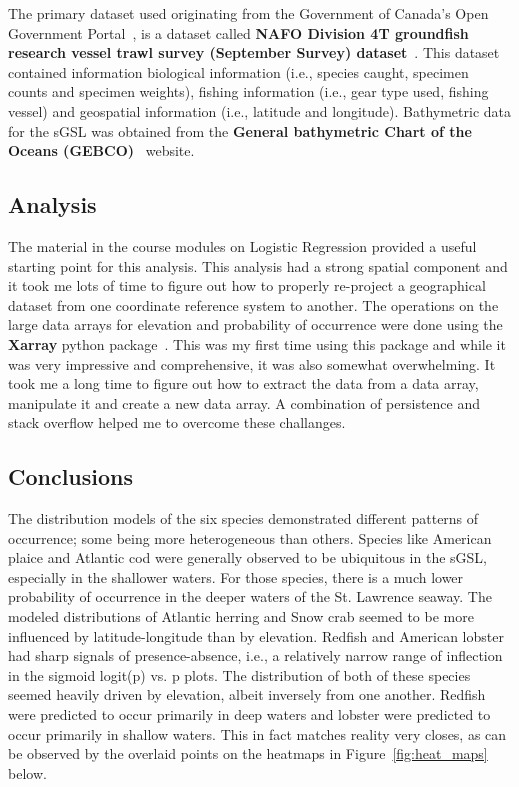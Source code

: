 The primary dataset used originating from the Government of Canada's Open Government Portal~\cite{ogp}, is a dataset called
\textbf{NAFO Division 4T groundfish research vessel trawl survey (September Survey) dataset}~\cite{groundfish}.
This dataset contained information biological information (i.e., species caught, specimen counts and specimen weights),
fishing information (i.e., gear type used, fishing vessel) and geospatial information (i.e., latitude and longitude).
Bathymetric data for the sGSL was obtained from the \textbf{General bathymetric Chart of the Oceans (GEBCO)}~\cite{gebco} website.


\subsection{Analysis}

The material in the course modules on Logistic Regression provided a useful starting point for this analysis.
This analysis had a strong spatial component and it took me lots of time to figure out how to properly re-project a geographical dataset
from one coordinate reference system to another.
The operations on the large data arrays for elevation and probability of occurrence were done using the \textbf{Xarray} python package~\cite{xarray}.
This was my first time using this package and while it was very impressive and comprehensive, it was also somewhat overwhelming.
It took me a long time to figure out how to extract the data from a data array, manipulate it and create a new data array.
A combination of persistence and stack overflow helped me to overcome these challanges.

\subsection{Conclusions}

The distribution models of the six species demonstrated different patterns of occurrence; some being more heterogeneous than others.
Species like American plaice and Atlantic cod were generally observed to be ubiquitous in the sGSL, especially in the shallower waters.
For those species, there is a much lower probability of occurrence in the deeper waters of the St. Lawrence seaway.
The modeled distributions of Atlantic herring and Snow crab seemed to be more influenced by latitude-longitude than by elevation.
Redfish and American lobster had sharp signals of presence-absence, i.e., a relatively narrow range of inflection in the sigmoid
logit(p) vs. p plots.
The distribution of both of these species seemed heavily driven by elevation, albeit inversely from one another.
Redfish were predicted to occur primarily in deep waters and lobster were predicted to occur primarily in shallow waters.
This in fact matches reality very closes, as can be observed by the overlaid points on the heatmaps in Figure~\ref{fig:heat_maps} below.



